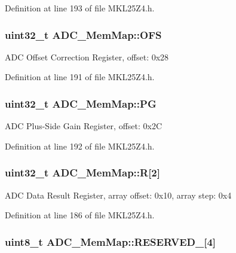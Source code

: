 Definition at line 193 of file M\+K\+L25\+Z4.\+h.

\subsubsection[{\texorpdfstring{O\+FS}{OFS}}]{\setlength{\rightskip}{0pt plus 5cm}uint32\+\_\+t A\+D\+C\+\_\+\+Mem\+Map\+::\+O\+FS}\hypertarget{struct_a_d_c___mem_map_a89e51c569b4a0e4298bc4524afabb594}{}\label{struct_a_d_c___mem_map_a89e51c569b4a0e4298bc4524afabb594}
A\+DC Offset Correction Register, offset\+: 0x28 

Definition at line 191 of file M\+K\+L25\+Z4.\+h.

\subsubsection[{\texorpdfstring{PG}{PG}}]{\setlength{\rightskip}{0pt plus 5cm}uint32\+\_\+t A\+D\+C\+\_\+\+Mem\+Map\+::\+PG}\hypertarget{struct_a_d_c___mem_map_aa63b6cd61d17dda7d69bdc02c7f5204a}{}\label{struct_a_d_c___mem_map_aa63b6cd61d17dda7d69bdc02c7f5204a}
A\+DC Plus-\/\+Side Gain Register, offset\+: 0x2C 

Definition at line 192 of file M\+K\+L25\+Z4.\+h.

\subsubsection[{\texorpdfstring{R}{R}}]{\setlength{\rightskip}{0pt plus 5cm}uint32\+\_\+t A\+D\+C\+\_\+\+Mem\+Map\+::R\mbox{[}2\mbox{]}}\hypertarget{struct_a_d_c___mem_map_acbd8ded0e3f30d8502e9b9229e092fe8}{}\label{struct_a_d_c___mem_map_acbd8ded0e3f30d8502e9b9229e092fe8}
A\+DC Data Result Register, array offset\+: 0x10, array step\+: 0x4 

Definition at line 186 of file M\+K\+L25\+Z4.\+h.

\subsubsection[{\texorpdfstring{R\+E\+S\+E\+R\+V\+E\+D\+\_\+0}{RESERVED_0}}]{\setlength{\rightskip}{0pt plus 5cm}uint8\+\_\+t A\+D\+C\+\_\+\+Mem\+Map\+::\+R\+E\+S\+E\+R\+V\+E\+D\+\_\mbox{[}4\mbox{]}}\hypertarget{struct_a_d_c___mem_map_ab6a26e3e3250e5cf4ee9d2fe63d28a82}{}\label{struct_a_d_c___mem_map_ab6a26e3e3250e5cf4ee9d2fe63d28a82}



